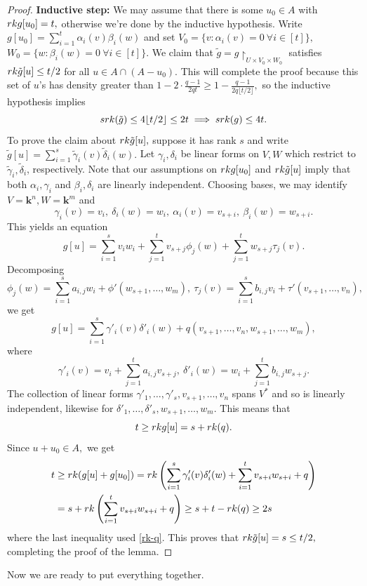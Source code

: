 \documentclass{daj}
\renewcommand{\k}{{\mathbf{k}}}
\newcommand{\rk}{\textnormal{rk}}
\newcommand{\srk}{\textnormal{srk}}
\begin{document}
\begin{proof}
         
         \textbf{Inductive step:} We may assume that there is some $u_0\in A$ with $\rk g[u_0] = t,$ otherwise we're done by the inductive hypothesis. Write $g[u_0] = \sum_{i=1}^t \alpha_i(v)\beta_i(w)$ and set $V_0 = \{v:\alpha_i(v) = 0\ \forall i\in[t]\},$ $W_0 = \{w:\beta_i(w) = 0\ \forall i\in[t]\}.$ We claim that $\tilde g = g\restriction_{U\times V_0\times W_0}$ satisfies $\rk \tilde g[u] \le t/2 $ for all $u\in A\cap (A-u_0).$ This will complete the proof because this set of $u$'s has density greater than $ 1-2\cdot \frac{q-1}{2qt} \ge 1- \frac{q-1}{2q\lfloor t/2\rfloor}, $ so the inductive hypothesis implies 
         \[
         \srk (\tilde g) \le 4\lfloor t/2\rfloor \le 2t \implies \srk(g) \le 4t.
         \]
        To prove the claim about $\rk \tilde g[u],$ suppose it has rank $s$ and write $\tilde g[u] = \sum_{i=1}^s \tilde\gamma_i(v) \tilde \delta_i(w).$ Let $\gamma_i,\delta_i$ be linear forms on $V,W$ which restrict to $\tilde\gamma_i,\tilde\delta_i$, respectively.  Note that our assumptions on $\rk g[u_0]$ and $\rk \tilde g[u]$ imply that  both $\alpha_i,\gamma_i$ and  $\beta_i,\delta_i$ are linearly independent. Choosing bases, we may identify $V=\k^n,W=\k^m$ and 
        $$ \gamma_i(v) = v_i,\ \delta_i(w) = w_i,\  \alpha_i(v) = v_{s+i},\ \beta_i(w) = w_{s+i}.$$ This yields an equation
         \[
         g[u] = \sum_{i=1}^s v_iw_i +\sum_{j=1}^t  v_{s+j} \phi_j (w)+\sum_{j=1}^t  w_{s+j} \tau_j (v).
         \]
         Decomposing $$\phi_j(w) = \sum_{i=1}^s a_{i,j} w_i + \phi'(w_{s+1},\ldots,w_m),\ \tau_j(v) = \sum_{i=1}^s b_{i,j} v_i + \tau'(v_{s+1},\ldots,v_n),$$ 
         we get 
         \[
         g[u] = \sum_{i=1}^s  \gamma'_i(v) \delta'_i(w) +q(v_{s+1},\ldots,v_n,w_{s+1},\ldots,w_m),
         \]
         where 
         \[
         \gamma'_i(v) = v_i+\sum_{j=1}^t a_{i,j} v_{s+j},\ \delta'_i(w)= w_i+\sum_{j=1}^t b_{i,j} w_{s+j}.
         \]
         The collection of linear forms $\gamma'_1,\ldots,\gamma'_s,v_{s+1},\ldots,v_n$ spans $V^*$ and so is linearly independent, likewise for $\delta'_1,\ldots,\delta'_s,w_{s+1},\ldots,w_m.$ This means that 
         \begin{equation}\label{rk-q}
             t\ge \rk g[u] = s+ \rk(q).
         \end{equation}
         Since $u+u_0\in A,$ we get 
         \begin{align*}
             t &\ge \rk(g[u]+g[u_0]) = \rk \left(\sum_{i=1}^s  \gamma'_i(v) \delta'_i(w)+\sum_{i=1}^t v_{s+i} w_{s+i}+q\right) \\
             &= s+\rk\left(\sum_{i=1}^t v_{s+i} w_{s+i}+q\right) \ge s+t-\rk(q) \ge 2s
         \end{align*}
         where the last inequality used \eqref{rk-q}. This proves that $\rk\tilde g[u] = s\le t/2,$ completing the proof of the lemma.
    \end{proof}
    Now we are ready to put everything together.
\end{document}
